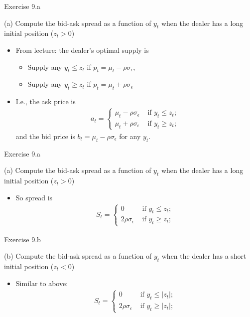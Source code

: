 \documentclass[english,10pt]{beamer}
\begin{document}
\begin{frame}{Exercise 9.a}
	\begin{exampleblock}{}
		(a) Compute the bid-ask spread as a function of $y_t$ when the dealer has a long initial position ($z_t > 0$)
	\end{exampleblock}
	\pause
	\begin{itemize}
		\item From lecture: the dealer's optimal supply is
		\begin{itemize}
			\item Supply any $y_t \leq z_t$ if $p_t = \mu_t - \rho\sigma_{\epsilon}$,
			\item Supply any $y_t \geq z_t$ if $p_t = \mu_t + \rho\sigma_{\epsilon}$
		\end{itemize}
		\item I.e., the ask price is
		\begin{align*}
			a_t = 
			\begin{cases}
				\mu_t - \rho\sigma_{\epsilon} & \text{ if } y_t \leq z_t;
				\\
				\mu_t + \rho\sigma_{\epsilon} & \text{ if } y_t \geq z_t;
			\end{cases}
		\end{align*}
		and the bid price is $b_t = \mu_t - \rho\sigma_{\epsilon}$ for any $y_t$.
	\end{itemize}
\end{frame}


\begin{frame}{Exercise 9.a}
	\begin{exampleblock}{}
		(a) Compute the bid-ask spread as a function of $y_t$ when the dealer has a long initial position ($z_t > 0$)
	\end{exampleblock}
	\begin{itemize}
		\item So spread is
		\begin{align*}
			S_t = 
			\begin{cases}
				0 & \text{ if } y_t \leq z_t;
				\\
				2\rho\sigma_{\epsilon} & \text{ if } y_t \geq z_t;
			\end{cases}
		\end{align*}
	\end{itemize}
\end{frame}


\begin{frame}{Exercise 9.b}
\begin{exampleblock}{}
	(b) Compute the bid-ask spread as a function of $y_t$ when the dealer has a short initial position ($z_t < 0$)
\end{exampleblock}
\begin{itemize}
	\item Similar to above:
	\begin{align*}
		S_t = 
		\begin{cases}
		0 & \text{ if } y_t \leq |z_t|;
		\\
		2\rho\sigma_{\epsilon} & \text{ if } y_t \geq |z_t|;
		\end{cases}
	\end{align*}
\end{itemize}
\end{frame}
\end{document}
